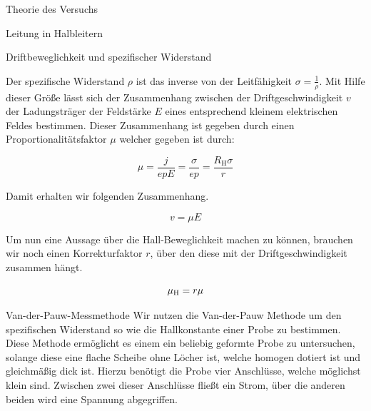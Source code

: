 \documentclass[pdftex, a4paper,11pt, twoside, ngerman]{report}
\begin{document}
\begin{chapter}{Theorie des Versuchs}
\begin{section}{Leitung in Halbleitern}
\begin{subsection}{Driftbeweglichkeit und spezifischer Widerstand}

            Der spezifische Widerstand $\rho$ ist das inverse von der Leitfähigkeit $\sigma = \frac 1\rho$.
            Mit Hilfe dieser Größe lässt sich der Zusammenhang zwischen der Driftgeschwindigkeit $v$ der Ladungsträger der Feldstärke $E$ eines entsprechend kleinem elektrischen Feldes bestimmen.
            Dieser Zusammenhang ist gegeben durch einen Proportionalitätsfaktor $\mu$ welcher gegeben ist durch:
            
            \begin{equation}
                \mu = \frac j{epE} = \frac \sigma{ep} = \frac{R_\text{H} \sigma}r
            \end{equation}
            
            Damit erhalten wir folgenden Zusammenhang.
            
            \begin{equation}
                v = \mu E
            \end{equation}
            
            Um nun eine Aussage über die Hall-Beweglichkeit machen zu können, brauchen wir noch einen Korrekturfaktor $r$, über den diese mit der Driftgeschwindigkeit zusammen hängt.
            
            \begin{equation}
                \mu_\text H =r\mu
            \end{equation}
            
        \end{subsection}

        \begin{subsection}{Van-der-Pauw-Messmethode}
            Wir nutzen die Van-der-Pauw Methode um den spezifischen Widerstand so wie die Hallkonstante einer Probe zu bestimmen.
            Diese Methode ermöglicht es einem ein beliebig geformte Probe zu untersuchen, solange diese eine flache Scheibe ohne Löcher ist, welche homogen dotiert ist und gleichmäßig dick ist.
            Hierzu benötigt die Probe vier Anschlüsse, welche möglichst klein sind. 
            Zwischen zwei dieser Anschlüsse fließt ein Strom, über die anderen beiden wird eine Spannung abgegriffen.
            

\end{subsection}
\end{section}
\end{chapter}
\end{document}
